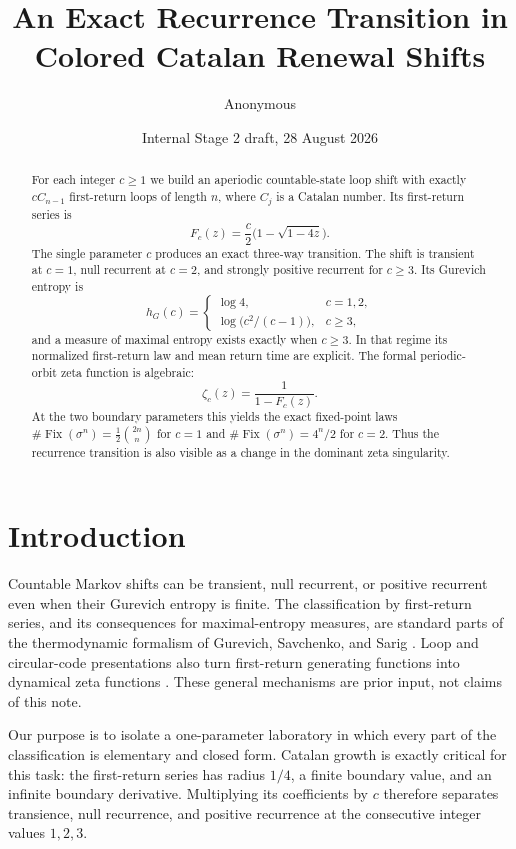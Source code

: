 \documentclass[11pt,a4paper]{amsart}
\title[Catalan renewal shifts]{An Exact Recurrence Transition in Colored Catalan Renewal Shifts}
\author{Anonymous}
\date{Internal Stage 2 draft, 28 August 2026}
\theoremstyle{definition}
\theoremstyle{remark}
\newcommand{\Fix}{\operatorname{Fix}}
\begin{document}
\begin{abstract}
For each integer $c\geq1$ we build an aperiodic countable-state loop shift
with exactly $cC_{n-1}$ first-return loops of length $n$, where $C_j$ is a
Catalan number.  Its first-return series is
\[
 F_c(z)=\frac c2\bigl(1-\sqrt{1-4z}\bigr).
\]
The single parameter $c$ produces an exact three-way transition.  The shift
is transient at $c=1$, null recurrent at $c=2$, and strongly positive
recurrent for $c\geq3$.  Its Gurevich entropy is
\[
 h_G(c)=\begin{cases}
 \log4,&c=1,2,\\
 \log\!\bigl(c^2/(c-1)\bigr),&c\geq3,
 \end{cases}
\]
and a measure of maximal entropy exists exactly when $c\geq3$.  In that
regime its normalized first-return law and mean return time are explicit.
The formal periodic-orbit zeta function is algebraic:
\[
 \zeta_c(z)=\frac{1}{1-F_c(z)}.
\]
At the two boundary parameters this yields the exact fixed-point laws
$\#\Fix(\sigma^n)=\frac12\binom{2n}{n}$ for $c=1$ and
$\#\Fix(\sigma^n)=4^n/2$ for $c=2$.  Thus the recurrence transition is also
visible as a change in the dominant zeta singularity.
\end{abstract}

\maketitle

\section{Introduction}

Countable Markov shifts can be transient, null recurrent, or positive
recurrent even when their Gurevich entropy is finite.  The classification by
first-return series, and its consequences for maximal-entropy measures, are
standard parts of the thermodynamic formalism of Gurevich, Savchenko, and
Sarig \cite{GurevichSavchenko1998,Sarig1999}.  Loop and circular-code
presentations also turn first-return generating functions into dynamical
zeta functions \cite{Keller1991}.  These general mechanisms are prior input,
not claims of this note.

Our purpose is to isolate a one-parameter laboratory in which every part of
the classification is elementary and closed form.  Catalan growth is exactly
critical for this task: the first-return series has radius $1/4$, a finite
boundary value, and an infinite boundary derivative.  Multiplying its
coefficients by $c$ therefore separates transience, null recurrence, and
positive recurrence at the consecutive integer values $1,2,3$.
\end{document}

